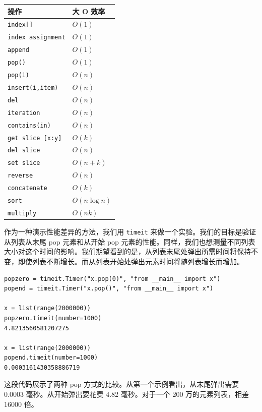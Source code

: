 \begin{frame}[fragile]\ft{\subsecname}

\begin{table}[htbp]
\centering
\begin{tabular}{ll} \hline
操作&大 O 效率 \\\hline
\lstinline|index[]|         & $O(1)$ \\
\lstinline|index assignment|& $O(1)$ \\
\lstinline|append|          & $O(1)$ \\
\lstinline|pop()|           & $O(1)$ \\
\lstinline|pop(i)|          & $O(n)$ \\
\lstinline|insert(i,item)|  & $O(n)$ \\
\lstinline|del|             & $O(n)$ \\
\lstinline|iteration|       & $O(n)$ \\
\lstinline|contains(in)|    & $O(n)$ \\
\lstinline|get slice [x:y]| & $O(k)$ \\
\lstinline|del slice|       & $O(n)$ \\
\lstinline|set slice|       & $O(n+k)$ \\
\lstinline|reverse|         & $O(n)$ \\
\lstinline|concatenate|     & $O(k)$ \\
\lstinline|sort|            & $O(n\log n)$ \\
\lstinline|multiply|        & $O(nk)$ \\\hline 
\end{tabular}
\end{table}

\end{frame}

\begin{frame}[fragile]\ft{\subsecname}

作为一种演示性能差异的方法，我们用 \lstinline|timeit| 来做一个实验。我们的目标是验证从列表从末尾 pop 元素和从开始 pop 元素的性能。同样，我们也想测量不同列表大小对这个时间的影响。我们期望看到的是，从列表末尾处弹出所需时间将保持不变，即使列表不断增长。而从列表开始处弹出元素时间将随列表增长而增加。

\begin{lstlisting}
popzero = timeit.Timer("x.pop(0)", "from __main__ import x")
popend = timeit.Timer("x.pop()", "from __main__ import x")

x = list(range(2000000))
popzero.timeit(number=1000)
4.8213560581207275

x = list(range(2000000))
popend.timeit(number=1000)
0.0003161430358886719
\end{lstlisting}

这段代码展示了两种 pop 方式的比较。从第一个示例看出，从末尾弹出需要 0.0003 毫秒。从开始弹出要花费 4.82 毫秒。对于一个 200 万的元素列表，相差 16000 倍。
\end{frame}

